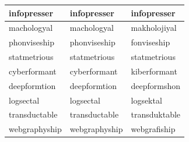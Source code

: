 \documentclass[10pt,twocolumn,letterpaper]{article}
\begin{document}
\begin{longtable}{|p{4cm}|p{4cm}|p{4cm}|}
infopresser & infopresser & infopresser \\ \hline
machologyal & machologyal & makholojiyal \\ \hline
phonviseship & phonviseship & fonviseship \\ \hline
statmetrious & statmetrious & statmetrious \\ \hline
cyberformant & cyberformant & kiberformant \\ \hline
deepformtion & deepformtion & deepformshon \\ \hline
logsectal & logsectal & logsektal \\ \hline
transductable & transductable & transduktable \\ \hline
webgraphyship & webgraphyship & webgrafiship \\ \hline
\end{longtable}
\end{document}
